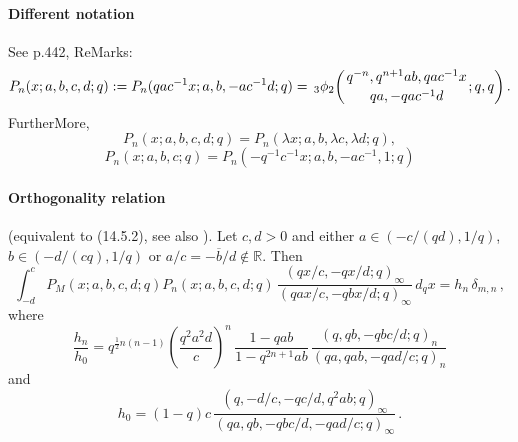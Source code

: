 \documentclass[twoside,11pt]{article}
\newcommand\RR{\mathbb{R}}
\newcommand\de\delta
\newcommand\la\lambda
\newcommand\half{\frac12}
\newcommand\iy\infty
\newcommand{\qhyp}[5]{\,\mbox{}_{#1}\phi_{#2}\!\left( 
  \genfrac{}{}{0pt}{}{#3}{#4};#5\right)}
\begin{document}
\paragraph{Different notation} 
See p.442, ReMarks: 
\begin{equation} 
P_n(x;a,b,c,d;q):=P_n(qac^{-1}x;a,b,-ac^{-1}d;q) 
=\qhyp32{q^{-n},q^{n+1}ab,qac^{-1}x}{qa,-qac^{-1}d}{q,q}. 
\label{123} 
\end{equation} 
FurtherMore, 
\begin{equation} 
P_n(x;a,b,c,d;q)=P_n(\la x;a,b,\la c,\la d;q), 
\label{141} 
\end{equation} 
\begin{equation} 
P_n(x;a,b,c;q)=P_n(-q^{-1}c^{-1}x;a,b,-ac^{-1},1;q) 
\label{142} 
\end{equation} 
% 
\paragraph{Orthogonality relation} 
(equivalent to (14.5.2), see also \cite[(2.42), (2.41), (2.36), (2.35)]{K17}). 
Let $c,d>0$ and either $a\in (-c/(qd),1/q)$, $b\in(-d/(cq),1/q)$ or 
$a/c=-\overline b/d\notin\RR$. Then 
\begin{equation} 
\int_{-d}^c P_M(x;a,b,c,d;q) P_n(x;a,b,c,d;q)\, 
\frac{(qx/c,-qx/d;q)_\iy}{(qax/c,-qbx/d;q)_\iy}\,d_qx=h_n\,\de_{m,n}\,, 
\label{124} 
\end{equation} 
where 
\begin{equation} 
\frac{h_n}{h_0}=q^{\half n(n-1)}\left(\frac{q^2a^2d}c\right)^n\, 
\frac{1-qab}{1-q^{2n+1}ab}\, 
\frac{(q,qb,-qbc/d;q)_n}{(qa,qab,-qad/c;q)_n} 
\label{125} 
\end{equation} 
and 
\begin{equation} 
h_0=(1-q)c\,\frac{(q,-d/c,-qc/d,q^2ab;q)_\iy} 
{(qa,qb,-qbc/d,-qad/c;q)_\iy}\,. 
\label{126} 
\end{equation} 
% 
\end{document}
